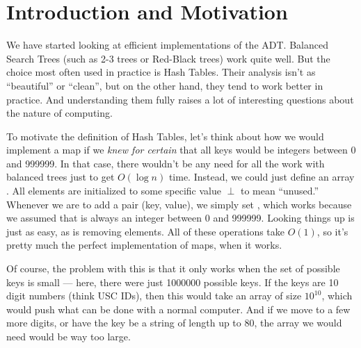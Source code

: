 \newcommand{\BasicSetup}{%
\multirput*{0}(-1,0)(1,0){13}{\psframe(0,0)(1,1)}
\rput(-0.75,1.25){\small 0}
\rput(0.25,1.25){\small 1}
\rput(1.25,1.25){\small 2}
\rput(2.25,1.25){\small 3}
\rput(3.25,1.25){\small 4}
\rput(4.25,1.25){\small 5}
\rput(5.25,1.25){\small 6}
\rput(6.25,1.25){\small 7}
\rput(7.25,1.25){\small 8}
\rput(8.25,1.25){\small 9}
\rput(9.25,1.25){\small 10}
\rput(10.25,1.25){\small 11}
\rput(11.25,1.25){\small 12}

\rput(2.5,2.5){$h(42)=3$}
\rput(3.5,3){$h(17)=4$}
\rput(7.5,2.5){$h(8)=8$}
\rput(8.5,3){$h(48)=9$}
\rput(11.5,2.5){$h(25)=12$}
\rput(11.5,3){$h(38)=12$}
\rput(11.5,3.5){$h(64)=12$}

\psline{->}(2.5,2)(2.5,1)
\psline{->}(3.5,2.5)(3.5,1)
\psline{->}(7.5,2)(7.5,1)
\psline{->}(8.5,2.5)(8.5,1)
\psline{->}(11.5,2)(11.5,1)
}

\section{Introduction and Motivation}
We have started looking at efficient implementations of the 
ADT. Balanced Search Trees (such as 2-3 trees or Red-Black
trees) work quite well. But the choice most often used in practice is
Hash Tables. Their analysis isn't as ``beautiful'' or ``clean'', but
on the other hand, they tend to work better in practice.
And understanding them fully raises a lot of interesting questions
about the nature of computing.

To motivate the definition of Hash Tables, let's think about how we
would implement a map if we \emph{knew for certain} that all
keys would be integers between 0 and 999999.
In that case, there wouldn't be any need for all the work with
balanced trees just to get $O(\log n)$ time. 
Instead, we could just define an array .
All elements are initialized to some specific value $\perp$ to mean
``unused.''
Whenever we are to add a pair \code(key, value), we simply set
, which works because we assumed that 
 is always an integer between 0 and 999999.
Looking things up is just as easy, as is removing elements.
All of these operations take $O(1)$, so it's pretty much the perfect
implementation of maps, when it works.

Of course, the problem with this is that it only works when the set of
possible keys is small --- here, there were just 1000000 possible keys.
If the keys are 10 digit numbers (think USC IDs), then this
would take an array of size $10^{10}$, which would push what can be
done with a normal computer. And if we move to a few more digits, or
have the key be a string of length up to 80, the array we would need
would be way too large.

